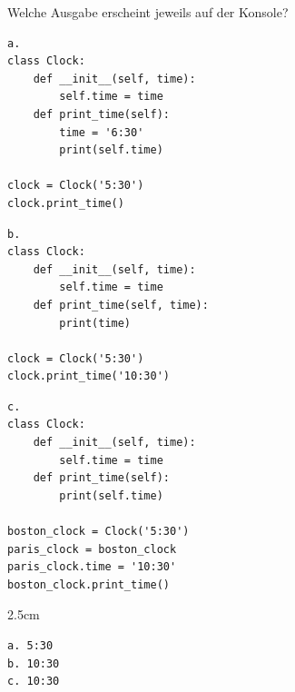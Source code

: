 
\question[4]
Welche Ausgabe erscheint jeweils auf der Konsole?
\begin{lstlisting}
a.
class Clock:
    def __init__(self, time):
        self.time = time
    def print_time(self):
        time = '6:30'
        print(self.time)

clock = Clock('5:30')
clock.print_time()
\end{lstlisting}

\begin{lstlisting}
b.
class Clock:
    def __init__(self, time):
        self.time = time
    def print_time(self, time):
        print(time)

clock = Clock('5:30')
clock.print_time('10:30')
\end{lstlisting}

\begin{lstlisting}
c.
class Clock:
    def __init__(self, time):
        self.time = time
    def print_time(self):
        print(self.time)

boston_clock = Clock('5:30')
paris_clock = boston_clock
paris_clock.time = '10:30'
boston_clock.print_time()
\end{lstlisting}


\begin{solutionbox}{2.5cm}
\begin{lstlisting}
a. 5:30
b. 10:30
c. 10:30
\end{lstlisting}
\end{solutionbox}
